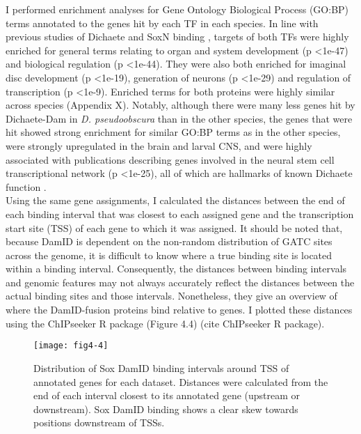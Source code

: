 I performed enrichment analyses for Gene Ontology Biological Process (GO:BP) terms annotated to the genes hit by each TF in each species. In line with previous studies of Dichaete and SoxN binding \citep{aleksic_role_2013,ferrero_soxneuro_2014}, targets of both TFs were highly enriched for general terms relating to organ and system development (p \textless 1e-47) and biological regulation (p \textless 1e-44). They were also both enriched for imaginal disc development (p \textless 1e-19), generation of neurons (p \textless 1e-29) and regulation of transcription (p \textless 1e-9). Enriched terms for both proteins were highly similar across species (Appendix X). Notably, although there were many less genes hit by Dichaete-Dam in \emph{D. pseudoobscura} than in the other species, the genes that were hit showed strong enrichment for similar GO:BP terms as in the other species, were strongly upregulated in the brain and larval CNS, and were highly associated with publications describing genes involved in the neural stem cell transcriptional network (p \textless 1e-25), all of which are hallmarks of known Dichaete function \citep{aleksic_role_2013,shen_identifying_2013,soriano_drosophila_1998}.\\ 

Using the same gene assignments, I calculated the distances between the end of each binding interval that was closest to each assigned gene and the transcription start site (TSS) of each gene to which it was assigned. It should be noted that, because DamID is dependent on the non-random distribution of GATC sites across the genome, it is difficult to know where a true binding site is located within a binding interval. Consequently, the distances between binding intervals and genomic features may not always accurately reflect the distances between the actual binding sites and those intervals. Nonetheless, they give an overview of where the DamID-fusion proteins bind relative to genes. I plotted these distances using the ChIPseeker R package (Figure 4.4) (cite ChIPseeker R package).\\ 

\begin{figure}
\centering
\texttt{[image: fig4-4]}
\caption{Distribution of Sox DamID binding intervals around TSS of annotated genes for each dataset. Distances were calculated from the end of each interval closest to its annotated gene (upstream or downstream). Sox DamID binding shows a clear skew towards positions downstream of TSSs.}
\label{Figure 4.4}
\end{figure}

